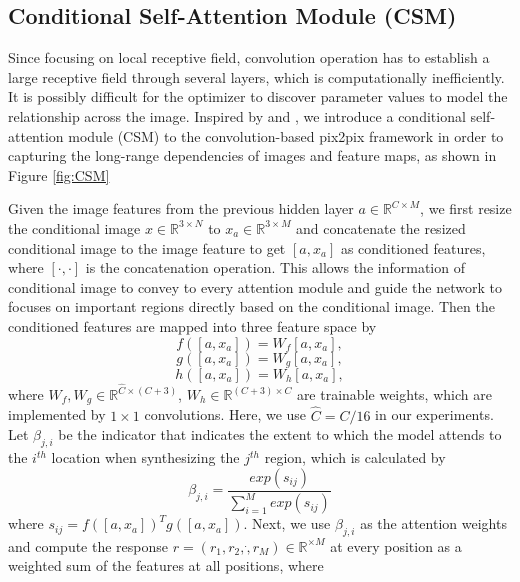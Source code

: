 \subsection{Conditional Self-Attention Module (CSM)}
Since focusing on local receptive field, convolution operation has to establish a large receptive field through several layers, which is computationally inefficiently. It is possibly difficult for the optimizer to discover parameter values to model the relationship across the image. Inspired by \cite{non-local} and \cite{SAGANs}, we introduce a conditional self-attention module (CSM) to the convolution-based pix2pix framework in order to capturing the long-range dependencies of images and feature maps, as shown in Figure \ref{fig:CSM}
%

Given the image features from the previous hidden layer $a\in \mathbb{R}^{C\times M}$, we first resize the conditional image $x\in \mathbb{R}^{3\times N}$ to  $x_a\in \mathbb{R}^{3\times M}$ and concatenate the resized conditional image to the image feature to get $[a, x_a]$ as conditioned features, where $[\cdot,\cdot]$ is the concatenation operation. This allows the information of conditional image to convey to every attention module and guide the network to focuses on important regions directly based on the conditional image.
%
Then the conditioned features are mapped into three feature space by
\begin{equation}
\label{eqn:f}
f([a, x_a])=W_f[a, x_a],
\end{equation}
\begin{equation}
\label{eqn:g}
g([a, x_a])=W_g[a, x_a],
\end{equation}
\begin{equation}
\label{eqn:h}
h([a, x_a])=W_h[a, x_a],
\end{equation}
where $W_f, W_g\in \mathbb{R}^{\hat{C}\times (C+3)}$, $W_h\in \mathbb{R}^{(C+3)\times C}$ are trainable weights, which are implemented by $1\times 1$ convolutions. Here, we use $\hat{C}=C/16$ in our experiments. 
%
Let $\beta_{j,i}$ be the indicator that indicates the extent to which the model attends to the $i^{th}$ location when synthesizing the $j^{th}$ region, which is calculated by 
\begin{equation}
\label{eqn:beta}
\beta_{j,i}=\frac{exp(s_{ij})}{\sum^M_{i=1}exp(s_{ij})}
\end{equation}
where $s_{ij}=f([a, x_a])^Tg([a, x_a])$. Next, we use $\beta_{j,i}$ as the attention weights and compute the response $r=(r_1, r_2,\dot, r_M)\in \mathbb{R}^{\times M}$ at every position as a weighted sum of the features at all positions, where
